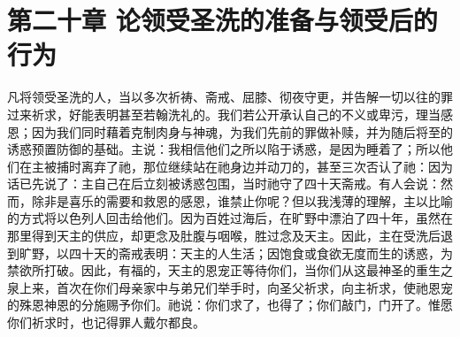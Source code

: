 
\section{第二十章 论领受圣洗的准备与领受后的行为}

凡将领受圣洗的人，当以多次祈祷、斋戒、屈膝、彻夜守更，并告解一切以往的罪过来祈求，好能表明甚至若翰洗礼的。我们若公开承认自己的不义或卑污，理当感恩；因为我们同时藉着克制肉身与神魂，为我们先前的罪做补赎，并为随后将至的诱惑预置防御的基础。主说：我相信他们之所以陷于诱惑，是因为睡着了；所以他们在主被捕时离弃了祂，那位继续站在祂身边并动刀的，甚至三次否认了祂：因为话已先说了：主自己在后立刻被诱惑包围，当时祂守了四十天斋戒。有人会说：然而，除非是喜乐的需要和救恩的感恩，谁禁止你呢？但以我浅薄的理解，主以比喻的方式将以色列人回击给他们。因为百姓过海后，在旷野中漂泊了四十年，虽然在那里得到天主的供应，却更念及肚腹与咽喉，胜过念及天主。因此，主在受洗后退到旷野，以四十天的斋戒表明：天主的人生活；因饱食或食欲无度而生的诱惑，为禁欲所打破。因此，有福的，天主的恩宠正等待你们，当你们从这最神圣的重生之泉上来，首次在你们母亲家中与弟兄们举手时，向圣父祈求，向主祈求，使祂恩宠的殊恩神恩的分施赐予你们。祂说：你们求了，也得了；你们敲门，门开了。惟愿你们祈求时，也记得罪人戴尔都良。\par

